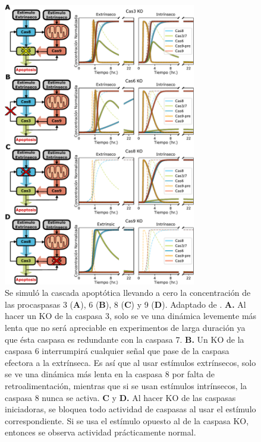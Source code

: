 \begin{figure}[b!]
    \centering
    \includegraphics[width=0.75\textwidth]{img/cap_4/ko_singles.pdf}
    \caption{\footnotesize{Se simuló la cascada apoptótica llevando a cero la concentración de las procaspasas 3 (\textbf{A}), 6 (\textbf{B}), 8 (\textbf{C}) y 9 (\textbf{D}). Adaptado de \cite{Corbat2021}. \textbf{A.} Al hacer un KO de la caspasa 3, solo se ve una dinámica levemente más lenta que no será apreciable en experimentos de larga duración ya que ésta caspasa es redundante con la caspasa 7. \textbf{B.} Un KO de la caspasa 6 interrumpirá cualquier señal que pase de la caspasa efectora a la extrínseca. Es así que al usar estímulos extrínsecos, solo se ve una dinámica más lenta en la caspasa 8 por falta de retroalimentación, mientras que si se usan estímulos intrínsecos, la caspasa 8 nunca se activa. \textbf{C} y \textbf{D.} Al hacer KO de las caspasas iniciadoras, se bloquea todo actividad de caspasas al usar el estímulo correspondiente. Si se usa el estímulo opuesto al de la caspasa KO, entonces se observa actividad prácticamente normal.}}
    \label{fig:KO_singles}
\end{figure}

